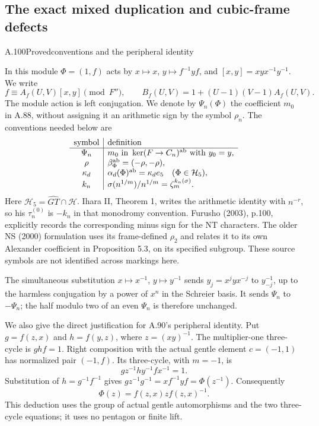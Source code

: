 \subsection{The exact mixed duplication and cubic-frame defects}


\begin{statement}{A.100}{Proved}{conventions and the peripheral identity}
\citep[Theorem 1]{LitIhara2000BetaGammaII} \citep[p.~100]{LitFurusho2003GTA}
\end{statement}
In this module $\Phi=(1,f)$ acts by
$x\mapsto x$, $y\mapsto f^{-1}yf$, and
$[x,y]=xyx^{-1}y^{-1}$. We write
\[
 f\equiv A_f(U,V)[x,y]\pmod{F''},\qquad
 B_f(U,V)=1+(U-1)(V-1)A_f(U,V).
\]
The module action is left conjugation. We denote by $\Psi_n(\Phi)$
the coefficient $m_0$ in A.88, without assigning it an arithmetic
sign by the symbol $\rho_n$. The conventions needed below are
\[
\begin{array}{c|l}
\text{symbol}&\text{definition}\\\hline
\Psi_n&m_0\text{ in }\ker(F\to C_n)^{\rm ab}\text{ with }y_0=y,\\
\rho&\beta_\Phi^{\rm ab}=(-\rho,-\rho),\\
\kappa_d&\alpha_d(\Phi)^{\rm ab}=\kappa_d e_5\quad(\Phi\in\mathcal H_5),\\
k_n&\sigma(n^{1/m})/n^{1/m}=\zeta_m^{k_n(\sigma)}.
\end{array}
\]
Here $\mathcal H_5=\widehat{GT}\cap\mathcal H$.
Ihara II, Theorem 1, writes the arithmetic identity with $n^{-r}$,
so his $\tau_n^{(0)}$ is $-k_n$ in that monodromy convention.
Furusho (2003), p.100, explicitly records the corresponding minus
sign for the NT characters. The older NS (2000) formulation uses
its frame-defined $\rho_2$ and relates it to its own Alexander
coefficient in Proposition 5.3, on its specified subgroup.
These source symbols are not identified across markings here.

The simultaneous substitution $x\mapsto x^{-1}$,
$y\mapsto y^{-1}$ sends $y_j=x^jyx^{-j}$ to $y_{-j}^{-1}$,
up to the harmless conjugation by a power of $x^n$ in the Schreier
basis. It sends $\Psi_n$ to $-\Psi_n$; the half modulo two of an
even $\Psi_n$ is therefore unchanged.

We also give the direct justification for A.90's peripheral identity.
Put $g=f(z,x)$ and $h=f(y,z)$, where $z=(xy)^{-1}$. The
multiplier-one three-cycle is $ghf=1$. Right composition with the
actual gentle element $c=(-1,1)$ has normalized pair $(-1,f)$.
Its three-cycle, with $m=-1$, is
\[
 gz^{-1}hy^{-1}fx^{-1}=1.
\]
Substitution of $h=g^{-1}f^{-1}$ gives
$gz^{-1}g^{-1}=xf^{-1}yf=\Phi(z^{-1})$. Consequently
\[
 \Phi(z)=f(z,x)z f(z,x)^{-1}.
\]
This deduction uses the group of actual gentle automorphisms and
the two three-cycle equations; it uses no pentagon or finite lift.

